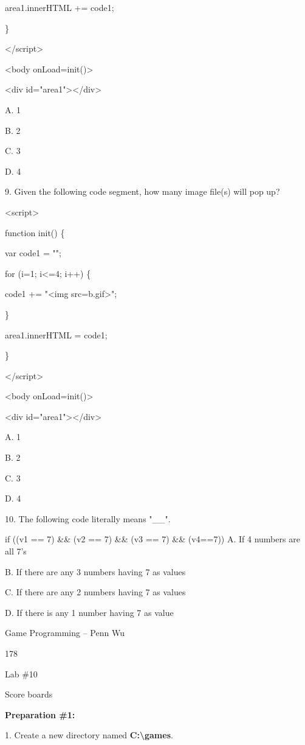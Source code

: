 \documentclass[
]{article}
\begin{document}
\protect\hypertarget{index_split_011.htmlux5cux23p178}{}{}
area1.innerHTML += code1;

\}

\textless/script\textgreater{}

\textless body onLoad=init()\textgreater{}

\textless div id="area1"\textgreater\textless/div\textgreater{}

A. 1

B. 2

C. 3

D. 4

9. Given the following code segment, how many image file(s) will pop up?

\textless script\textgreater{}

function init() \{

var code1 = "";

for (i=1; i\textless=4; i++) \{

code1 += "\textless img src=b.gif\textgreater";

\}

area1.innerHTML = code1;

\}

\textless/script\textgreater{}

\textless body onLoad=init()\textgreater{}

\textless div id="area1"\textgreater\textless/div\textgreater{}

A. 1

B. 2

C. 3

D. 4

10. The following code literally means "\_\_".

if ((v1 == 7) \&\& (v2 == 7) \&\& (v3 == 7) \&\& (v4==7)) A. If 4
numbers are all 7's

B. If there are any 3 numbers having 7 as values

C. If there are any 2 numbers having 7 as values

D. If there is any 1 number having 7 as value

Game Programming -- Penn Wu

178

\protect\hypertarget{index_split_011.htmlux5cux23p179}{}{}

Lab \#10

Score boards

\textbf{Preparation \#1:}

1. Create a new directory named \textbf{C:\textbackslash games}.
\end{document}
